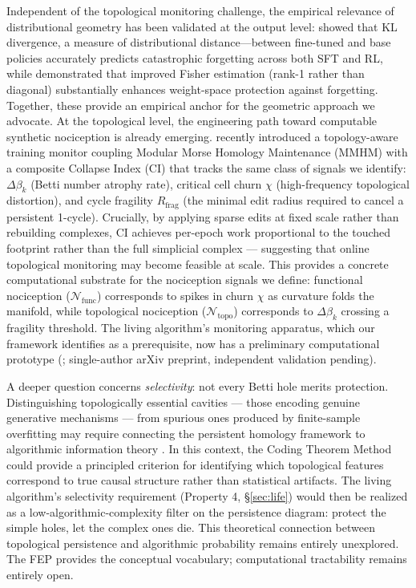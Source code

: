 \documentclass{article}
\begin{document}
Independent of the topological monitoring challenge, the empirical relevance of distributional geometry has been validated at the output level: \citet{Shenfeld2025RLRazor} showed that KL divergence, a measure of distributional distance---between fine-tuned and base policies accurately predicts catastrophic forgetting across both SFT and RL, while \citet{Wang2025rank1fisher} demonstrated that improved Fisher estimation (rank-1 rather than diagonal) substantially enhances weight-space protection against forgetting. Together, these provide an empirical anchor for the geometric approach we advocate. At the topological level, the engineering path toward computable synthetic nociception is already emerging. \citet{Kalinowski2026collapse} recently introduced a topology-aware training monitor coupling Modular Morse Homology Maintenance (MMHM) with a composite Collapse Index (CI) that tracks the same class of signals we identify: $\Delta \beta_k$ (Betti number atrophy rate), critical cell churn $\chi$ (high-frequency topological distortion), and cycle fragility $R_{\text{frag}}$ (the minimal edit radius required to cancel a persistent 1-cycle). Crucially, by applying sparse edits at fixed scale rather than rebuilding complexes, CI achieves per-epoch work proportional to the touched footprint rather than the full simplicial complex — suggesting that online topological monitoring may become feasible at scale. This provides a concrete computational substrate for the nociception signals we define: functional nociception ($\mathcal{N}_{\text{func}}$) corresponds to spikes in churn $\chi$ as curvature folds the manifold, while topological nociception ($\mathcal{N}_{\text{topo}}$) corresponds to $\Delta \beta_k$ crossing a fragility threshold. The living algorithm's monitoring apparatus, which our framework identifies as a prerequisite, now has a preliminary computational prototype (\citet{Kalinowski2026collapse}; single-author arXiv preprint, independent validation pending).

A deeper question concerns \emph{selectivity}: not every Betti hole merits protection. Distinguishing topologically essential cavities --- those encoding genuine generative mechanisms --- from spurious ones produced by finite-sample overfitting may require connecting the persistent homology framework to algorithmic information theory \citep{Zenil2026limits}. In this context, the Coding Theorem Method could provide a principled criterion for identifying which topological features correspond to true causal structure rather than statistical artifacts. The living algorithm's selectivity requirement (Property 4, \S\ref{sec:life}) would then be realized as a low-algorithmic-complexity filter on the persistence diagram: protect the simple holes, let the complex ones die. This theoretical connection between topological persistence and algorithmic probability remains entirely unexplored. The FEP provides the conceptual vocabulary; computational tractability remains entirely open.
\end{document}
